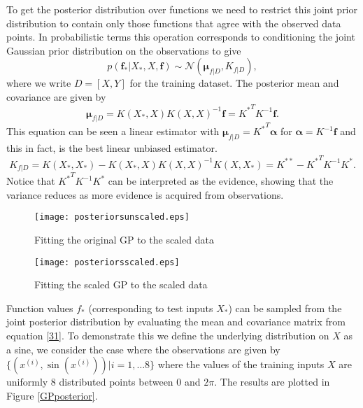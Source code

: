 \documentclass[english]{article}
\begin{document}
To get the posterior distribution over functions we need to restrict this joint prior distribution to contain only those functions that agree with the observed data points. In probabilistic terms this operation corresponds to conditioning the joint Gaussian prior distribution on the observations to give
\begin{equation}\label{31}
	p(\textbf{f}_*|X_*, X, \textbf{f}) \sim \mathcal{N}(\boldsymbol{\mu}_{f|D}, K_{f|D}),
\end{equation}
where we write $D=[X,Y]$ for the training dataset. The posterior mean and covariance are given by
\begin{equation}
	\boldsymbol{\mu}_{f|D} = K(X_*,X)K(X,X)^{-1}\textbf{f} = {K^*}^T K^{-1} \textbf{f}.
\end{equation}
This equation can be seen a linear estimator with $\boldsymbol{\mu}_{f|D} = {K^*}^T \boldsymbol{\alpha}$ for $\boldsymbol{\alpha} = K^{-1}\textbf{f}$ and this in fact, is the best linear unbiased estimator.
\begin{equation}
	K_{f|D} = K(X_*, X_*) - K(X_*, X)K(X, X)^{-1}K(X, X_*) = K^{**}-{K^*}^TK^{-1}K^*.
\end{equation}
Notice that ${K^*}^TK^{-1}K^*$ can be interpreted as the evidence, showing that the variance reduces as more evidence is acquired from observations.

\begin{figure}[h]
	\centering
		\begin{minipage}[c]{.45\linewidth}
			\centering
			\texttt{[image: posteriorsunscaled.eps]}
			\caption{Fitting the original GP to the scaled data}
			\label{GPscaled}
		\end{minipage}
\hfil
		\begin{minipage}[c]{.45\linewidth}
			\centering
			\texttt{[image: posteriorsscaled.eps]}
			\caption{Fitting the scaled GP to the scaled data}
			\label{GPfitted}
		\end{minipage}
\end{figure}
Function values $f_*$ (corresponding to test inputs $X_*$) can be sampled from the joint posterior distribution by evaluating the mean and covariance matrix from equation \ref{31}. To demonstrate this we define the underlying distribution on $X$ as a sine, we consider the case where the observations are given by $\{(x^{(i)},\sin(x^{(i)}))|i=1,\ldots 8\}$ where the values of the training inputs $X$ are uniformly 8 distributed points between $0$ and $2\pi$. The results are plotted in Figure \ref{GPposterior}.
\end{document}
